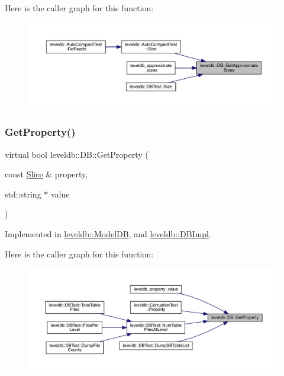 Here is the caller graph for this function\+:
\nopagebreak
\begin{figure}[H]
\begin{center}
\leavevmode
\includegraphics[width=350pt]{classleveldb_1_1_d_b_ad4d54aa1dbcecc8583b013ab2d67aeff_icgraph}
\end{center}
\end{figure}
\mbox{\label{classleveldb_1_1_d_b_afcd557d80bac6668f20372c9e737d807}} 
\subsubsection{\texorpdfstring{GetProperty()}{GetProperty()}}
{\footnotesize\ttfamily virtual bool leveldb\+::\+D\+B\+::\+Get\+Property (\begin{DoxyParamCaption}\item[{const \mbox{\hyperlink{classleveldb_1_1_slice}{Slice}} \&}]{property,  }\item[{std\+::string $\ast$}]{value }\end{DoxyParamCaption})\hspace{0.3cm}{\ttfamily [pure virtual]}}



Implemented in \mbox{\hyperlink{classleveldb_1_1_model_d_b_a5c83a50a08e45c2564c39a650ea55b86}{leveldb\+::\+Model\+DB}}, and \mbox{\hyperlink{classleveldb_1_1_d_b_impl_ad1a2023ce171c8f8476664f5b1cbab4d}{leveldb\+::\+D\+B\+Impl}}.

Here is the caller graph for this function\+:
\nopagebreak
\begin{figure}[H]
\begin{center}
\leavevmode
\includegraphics[width=350pt]{classleveldb_1_1_d_b_afcd557d80bac6668f20372c9e737d807_icgraph}
\end{center}
\end{figure}
\mbox{\label{classleveldb_1_1_d_b_a7d13f6336c7c5f0bf79578d57c45568c}} 
